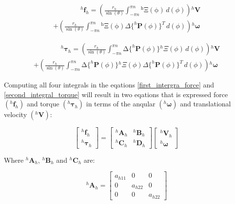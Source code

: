 \documentclass[12pt,a4paper,titlepage]{report}
\begin{document}
 
\begin{multline}
\qquad \qquad^{h}\bm{f}_h = \left (  \frac{r_h}{\sin(\theta)}  \int _{-\pi n}^{\pi n} \mathrm {^{h}\Xi(\phi)}\, d(\phi)  \right){^{h}{\bm{V}}} \\ 
+ \left ( \frac{r_h}{\sin(\theta)}  \int _{-\pi n}^{\pi n} \mathrm {^{h}\Xi(\phi)}  \Delta{\{^{h}\bm{P}(\phi)}\}^T    \, d(\phi)    \right){^{h}{\bm{\omega}}}
\label{first_intergra_force}
\end{multline} 


\begin{multline}
\qquad \qquad ^{h}\bm{\tau}_h = \left (  \frac{r_h}{\sin(\theta)}  \int _{-\pi n}^{\pi n} \mathrm \Delta{\{^{h}\bm{P}(\phi)}\} {^{h}\Xi(\phi)}\, d(\phi) \right){^{h}{\bm{V}}} \\
 + \left ( \frac{r_h}{\sin(\theta)} \int _{-\pi n}^{\pi n} \mathrm \Delta{\{^{h}\bm{P}(\phi)}\} {^{h}\Xi(\phi)} \Delta{\{^{h}\bm{P}(\phi)}\}^T \, d(\phi) \right){^{h}{\bm{\omega}}}
\label{second_integral_torque}
\end{multline} 

Computing all four integrals in the eqations \ref{first_intergra_force} and \ref{second_integral_torque} will
result in two eqations that is expressed force $(^{h}\bm{f}_h)$ and torque $(^{h}\bm{\tau}_h)$ in 
terms of the anqular $(^{h}\bm{\omega})$ and translational velocity $(^{h}\bm{V})$: 


\[
\begin{bmatrix} ^{h}\bm{f}_h\\ 
^{h}\bm{\tau}_h\end{bmatrix}  = \begin{bmatrix} ^{h}\bm{A}_h & ^{h}\bm{B}_h \\ 
^{h}\bm{C}_h & ^{h}\bm{D}_h \end{bmatrix}  \begin{bmatrix} ^{h}\bm{V}_h
 \\ ^{h}\bm{\omega}
\end{bmatrix}
\]


Where $^{h}\bm{A}_h$, $^{h}\bm{B}_h$ and $^{h}\bm{C}_h$ are:

\begin{equation}
 ^{h}\bm{A}_h = \begin{bmatrix}
       a_{h11}  & 0 		 & 0           \\[0.3em]
       0		 & a_{h22}           & 0\\[0.3em]
       0           	& 0 		& a_{h22}
     \end{bmatrix}
\label{Amatrix}
\end{equation}
\end{document}
